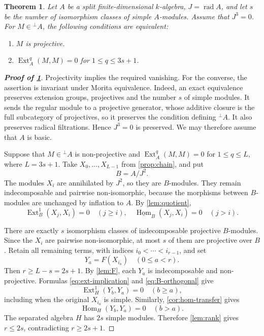 \documentclass[10pt,a4paper]{amsart}
\newtheorem{theorem}{Theorem}
\newcommand{\Ext}{\operatorname{Ext}}
\newcommand{\Hom}{\operatorname{Hom}}
\newcommand{\perpA}{{}^{\perp}\!A}
\newcommand{\rad}{\operatorname{rad}}
\newcommand{\stableHom}{\underline{\Hom}}
\begin{document}
\begin{theorem}\label{thm:main}
Let $A$ be a split finite-dimensional $k$-algebra, $J=\rad A$,
and let $s$ be the number of isomorphism classes of simple
$A$-modules. Assume that $J^3=0$. For $M\in\perpA$, the following
conditions are equivalent:
\begin{enumerate}[label=\textnormal{(\roman*)},leftmargin=2.2em]
 \item $M$ is projective.
 \vspace{2mm}
 \item $\Ext_A^q(M,M)=0$ for $1\le q\le 3s+1$.
\end{enumerate}
\end{theorem}

\begin{proof}[\bf \emph{Proof of \cref{thm:main}}]
Projectivity implies the required vanishing. For the converse, the
assertion is invariant under Morita equivalence. Indeed, an exact
equivalence preserves extension groups, projectives and the number
$s$ of simple modules. It sends the regular module to a projective
generator, whose additive closure is the full subcategory of
projectives, so it preserves the condition defining $\perpA$.
It also preserves radical filtrations. Hence $J^3=0$ is preserved.
We may therefore assume that $A$ is basic.

Suppose that $M\in\perpA$ is non-projective and
$\Ext_A^q(M,M)=0$ for $1\le q\le L$, where $L=3s+1$.
Take $X_0,\ldots,X_{L-1}$ from \cref{prop:chain}, and put
\[
 B=A/J^2.
\]
The modules $X_i$ are annihilated by $J^2$, so they are $B$-modules.
They remain indecomposable and pairwise non-isomorphic, because
the morphisms between $B$-modules are unchanged by inflation to $A$.
By \cref{lem:quotient},
\begin{equation}\label{eq:B-orthogonal}
 \Ext_B^1(X_j,X_i)=0\quad(j\ge i),
 \quad\stableHom_B(X_j,X_i)=0\quad(j>i).
\end{equation}

There are exactly $s$ isomorphism classes of indecomposable
projective $B$-modules. Since the $X_i$ are pairwise non-isomorphic,
at most $s$ of them are projective over $B$. Retain all remaining
terms, with indices $i_0<\cdots<i_{r-1}$, and set
\[
 Y_a=F(X_{i_a})\quad(0\le a<r).
\]
Then $r\ge L-s=2s+1$. By \cref{lem:F}, each $Y_a$ is
indecomposable and non-projective. Formulas
\eqref{eq:ext-implication} and \eqref{eq:B-orthogonal} give
\[
 \Ext_H^1(Y_b,Y_a)=0\quad(b\ge a),
\]
including when the original $X_{i_a}$ is simple. Similarly,
\cref{cor:hom-transfer} gives
\[
 \Hom_H(Y_b,Y_a)=0\quad(b>a).
\]
The separated algebra $H$ has $2s$ simple modules. Therefore
\cref{lem:rank} gives $r\le2s$, contradicting $r\ge2s+1$.
\end{proof}
\end{document}
